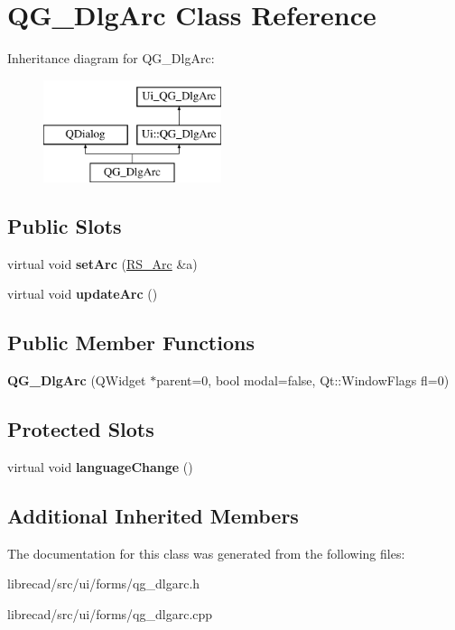 \hypertarget{classQG__DlgArc}{\section{Q\-G\-\_\-\-Dlg\-Arc Class Reference}
\label{classQG__DlgArc}
}
Inheritance diagram for Q\-G\-\_\-\-Dlg\-Arc\-:\begin{figure}[H]
\begin{center}
\leavevmode
\includegraphics[height=3.000000cm]{classQG__DlgArc}
\end{center}
\end{figure}
\subsection*{Public Slots}
\begin{DoxyCompactItemize}
\item 
\hypertarget{classQG__DlgArc_a86aa7c5166fa1b2e9bec7a38fa07436a}{virtual void {\bfseries set\-Arc} (\hyperlink{classRS__Arc}{R\-S\-\_\-\-Arc} \&a)}\label{classQG__DlgArc_a86aa7c5166fa1b2e9bec7a38fa07436a}

\item 
\hypertarget{classQG__DlgArc_ac2f79d5e083cbc6f578b56b347807b6b}{virtual void {\bfseries update\-Arc} ()}\label{classQG__DlgArc_ac2f79d5e083cbc6f578b56b347807b6b}

\end{DoxyCompactItemize}
\subsection*{Public Member Functions}
\begin{DoxyCompactItemize}
\item 
\hypertarget{classQG__DlgArc_a5f8f22c25e03b1fc0645b26c9dc44297}{{\bfseries Q\-G\-\_\-\-Dlg\-Arc} (Q\-Widget $\ast$parent=0, bool modal=false, Qt\-::\-Window\-Flags fl=0)}\label{classQG__DlgArc_a5f8f22c25e03b1fc0645b26c9dc44297}

\end{DoxyCompactItemize}
\subsection*{Protected Slots}
\begin{DoxyCompactItemize}
\item 
\hypertarget{classQG__DlgArc_af2c8d6f91a0bed9cd46fee917bfaa447}{virtual void {\bfseries language\-Change} ()}\label{classQG__DlgArc_af2c8d6f91a0bed9cd46fee917bfaa447}

\end{DoxyCompactItemize}
\subsection*{Additional Inherited Members}


The documentation for this class was generated from the following files\-:\begin{DoxyCompactItemize}
\item 
librecad/src/ui/forms/qg\-\_\-dlgarc.\-h\item 
librecad/src/ui/forms/qg\-\_\-dlgarc.\-cpp\end{DoxyCompactItemize}
